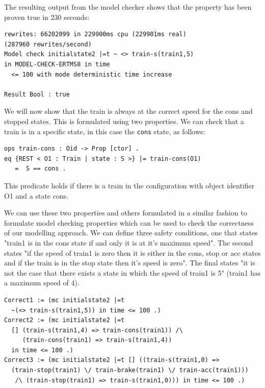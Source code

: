The resulting output from the model checker shows that the property has been proven true in 230 seconds:

\begin{lstlisting}[caption = The result of model checking the max speed property for train1 ]
rewrites: 66202099 in 229900ms cpu (229901ms real) 
(287960 rewrites/second)
Model check initialstate2 |=t ~ <> train-s(train1,5)
in MODEL-CHECK-ERTMS8 in time
  <= 100 with mode deterministic time increase

Result Bool : true
\end{lstlisting}

We will now show that the train is always at the correct speed for the cons and stopped states. This is formulated using two properties. We can check that a train is in a specific state, in this case the \texttt{cons} state, as follows:

\begin{lstlisting}[caption = The cons state property]
ops train-cons : Oid -> Prop [ctor] .
eq {REST < O1 : Train | state : S >} |= train-cons(O1) 
   =  S == cons . 
\end{lstlisting}


This predicate holds if there is a train in the configuration with object identifier O1 and a state cons. 

We can use these two properties and others formulated in a similar fashion to formulate model checking properties which can be used to check the correctness of our modelling approach. We can define three safety conditions, one that states "train1 is in the cons state if and only it is at it's maximum speed". The second states "if the speed of train1 is zero then it is either in the cons, stop or acc states and if the train is in the stop state then it's speed is zero". The final states "it is not the case that there exists a state in which the speed of train1 is 5" (train1 has a maximum speed of 4). 

\begin{lstlisting}[caption = The model checking commands for the correctness properties ]
Correct1 := (mc initialstate2 |=t  
  ~(<> train-s(train1,5)) in time <= 100 .)
Correct2 := (mc initialstate2 |=t 
  [] (train-s(train1,4) => train-cons(train1)) /\ 
     (train-cons(train1) => train-s(train1,4))  
  in time <= 100 .)
Correct3 := (mc initialstate2 |=t [] ((train-s(train1,0) => 
  (train-stop(train1) \/ train-brake(train1) \/ train-acc(train1))) 
   /\ (train-stop(train1) => train-s(train1,0))) in time <= 100 .)
\end{lstlisting}

